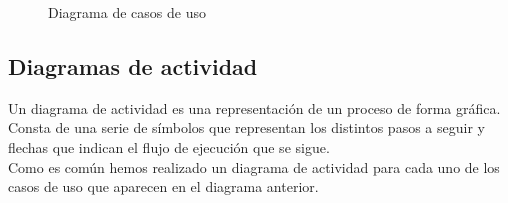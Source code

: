 \begin{sidewaysfigure}
\centering
\casos
\caption{Diagrama de casos de uso}
\end{sidewaysfigure}

\subsection{Diagramas de actividad}
Un diagrama de actividad es una representación de un proceso de forma gráfica. Consta de una serie de símbolos que representan los distintos pasos a seguir y flechas que indican el flujo de ejecución que se sigue.\\

Como es común hemos realizado un diagrama de actividad para cada uno de los casos de uso que aparecen en el diagrama anterior.

